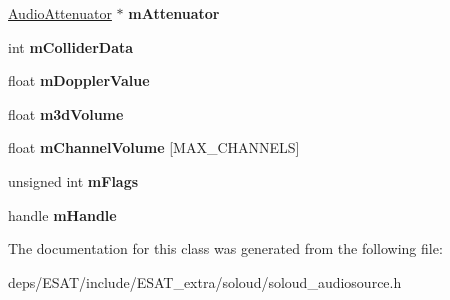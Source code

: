 \begin{DoxyCompactItemize}
\mbox{\label{class_so_loud_1_1_audio_source_instance3d_data_aa03eee66c2b601dd2a8a3d25db937476}} 
\mbox{\hyperlink{class_so_loud_1_1_audio_attenuator}{Audio\+Attenuator}} $\ast$ {\bfseries m\+Attenuator}
\item 
\mbox{\label{class_so_loud_1_1_audio_source_instance3d_data_a6234a25705806d11ac592fedf0a23dd1}} 
int {\bfseries m\+Collider\+Data}
\item 
\mbox{\label{class_so_loud_1_1_audio_source_instance3d_data_ac80ea416032cf6716fddc475252957bc}} 
float {\bfseries m\+Doppler\+Value}
\item 
\mbox{\label{class_so_loud_1_1_audio_source_instance3d_data_a68c3fd0171ee8236d091215cf3ce8eb8}} 
float {\bfseries m3d\+Volume}
\item 
\mbox{\label{class_so_loud_1_1_audio_source_instance3d_data_a7ba2af92eb1802f8a926e1b025ed433f}} 
float {\bfseries m\+Channel\+Volume} \mbox{[}M\+A\+X\+\_\+\+C\+H\+A\+N\+N\+E\+LS\mbox{]}
\item 
\mbox{\label{class_so_loud_1_1_audio_source_instance3d_data_acebb48b1a0c28291caa8278cf6bb52ea}} 
unsigned int {\bfseries m\+Flags}
\item 
\mbox{\label{class_so_loud_1_1_audio_source_instance3d_data_a36f1497ab59e11f86125eda3e8b799e8}} 
handle {\bfseries m\+Handle}
\end{DoxyCompactItemize}


The documentation for this class was generated from the following file\+:\begin{DoxyCompactItemize}
\item 
deps/\+E\+S\+A\+T/include/\+E\+S\+A\+T\+\_\+extra/soloud/soloud\+\_\+audiosource.\+h\end{DoxyCompactItemize}
